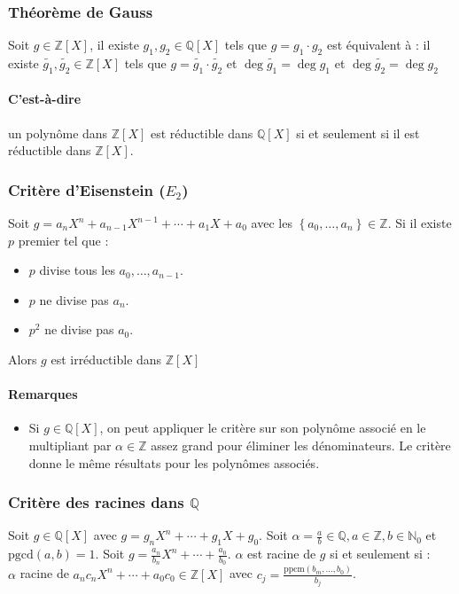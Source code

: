 \documentclass[a4paper,10pt]{article}
\newcommand{\mt}[1]{\widetilde{ #1 }} %
\newcommand{\set}[1]{\left\lbrace #1 \right\rbrace } %
\newcommand{\ZZ}{\mathbb{Z}} %
\newcommand{\NN}{\mathbb{N}} %
\newcommand{\QQ}{\mathbb{Q}} %
\newcommand{\pgcd}{\mathrm{pgcd}} %
\newcommand{\ppcm}{\mathrm{ppcm}}
\begin{document}
  \subsubsection{Théorème de Gauss}
   Soit $g \in \ZZ[X]$, il existe $g_1,g_2 \in \QQ[X]$ tels que $g=g_1\cdot g_2$
   est équivalent à : il existe $\mt{g_1},\mt{g_2} \in \ZZ[X]$ tels que
   $g = \mt{g_1} \cdot \mt{g_2}$
   et $\deg \mt{g_1} = \deg g_1$ et $\deg \mt{g_2} = \deg g_2$
   \paragraph{C'est-à-dire} un polynôme dans $\ZZ[X]$ est réductible dans
   $\QQ[X]$ si et seulement si il est réductible dans $\ZZ[X]$.
  
  \subsubsection{Critère d'Eisenstein ($E_2$)}
   Soit $g=a_n X^n+a_{n-1}X^{n-1}+ \cdots + a_1 X + a_0$ avec les
   $\set{a_0, \hdots, a_n} \in \ZZ$. Si il existe $p$ premier tel que :
   \begin{itemize}
     \item $p$ divise tous les $a_0, \hdots, a_{n-1}$.
     \item $p$ ne divise pas $a_n$.
     \item $p^2$ ne divise pas $a_0$.	
   \end{itemize}
   Alors $g$ est irréductible dans $\ZZ[X]$
   \paragraph{Remarques} 
   \begin{itemize}
     \item Si $g \in \QQ[X]$, on peut appliquer le critère sur son polynôme
       associé en le multipliant par $\alpha \in \ZZ$ assez grand pour éliminer
       les dénominateurs. Le critère donne le même résultats pour les polynômes
       associés.
   \end{itemize}
  \subsubsection{Critère des racines dans $\QQ$}
   Soit $g \in \QQ[X]$ avec $g=g_n X^n + \cdots + g_1 X + g_0$. Soit 
   $\alpha = \frac{a}{b} \in \QQ, a\in \ZZ, b \in \NN_0$ et $\pgcd (a,b)=1$.
   Soit $g=\frac{a_n}{b_n} X^n + \cdots + \frac{a_0}{b_0}$. $\alpha$ est racine
   de $g$ si et seulement si : \\
   $\alpha$ racine de $a_n c_n X^n + \cdots + a_0 c_0 \in \ZZ[X]$ avec
   $c_j=\frac{\ppcm (b_m, \hdots, b_0)}{b_j}$.
\end{document}
